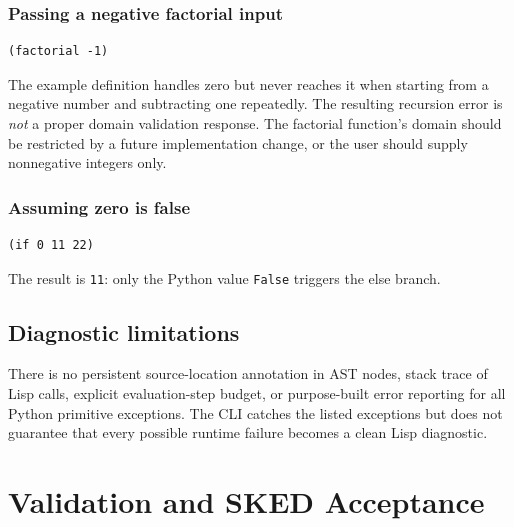 \documentclass[11pt,a4paper,oneside]{report}
\begin{document}
\subsection{Passing a negative factorial input}
\begin{lstlisting}
(factorial -1)
\end{lstlisting}
The example definition handles zero but never reaches it when starting from a negative number and subtracting one repeatedly. The resulting recursion error is \emph{not} a proper domain validation response. The factorial function's domain should be restricted by a future implementation change, or the user should supply nonnegative integers only.
\subsection{Assuming zero is false}
\begin{lstlisting}
(if 0 11 22)
\end{lstlisting}
The result is \texttt{11}: only the Python value \texttt{False} triggers the else branch.
\section{Diagnostic limitations}
There is no persistent source-location annotation in AST nodes, stack trace of Lisp calls, explicit evaluation-step budget, or purpose-built error reporting for all Python primitive exceptions. The CLI catches the listed exceptions but does not guarantee that every possible runtime failure becomes a clean Lisp diagnostic.

\chapter{Validation and SKED Acceptance}
\end{document}
